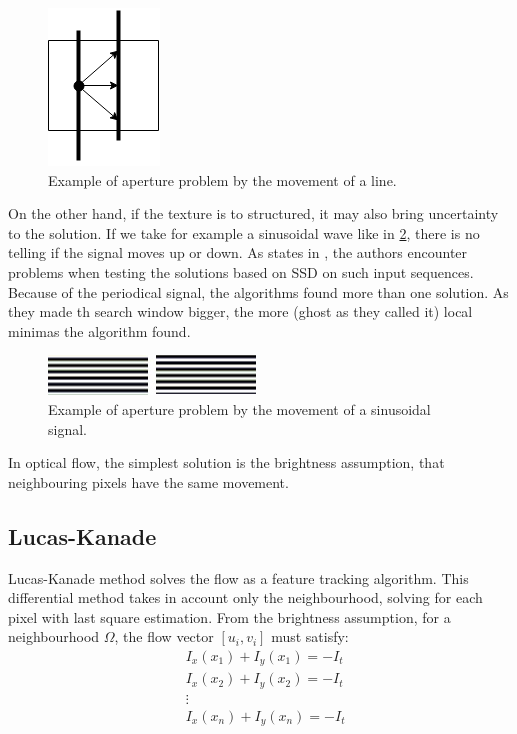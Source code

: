 \documentclass[12pt,a4paper,twoside]{report}
\begin{document}
\begin{figure}
	\label{apertureimg}
	\centering
	\includegraphics{img/Aperture}
	\caption{Example of aperture problem by the movement of a line.}
\end{figure}

On the other hand, if the texture is to structured, it may also bring uncertainty to the solution. If we take for example a sinusoidal wave like in \ref{apertureimgSin}, there is no telling if the signal moves up or down. As states in \cite{barron1994}, the authors encounter problems when testing the solutions based on SSD on such input sequences. Because of the periodical signal, the algorithms found more than one solution. As they made th search window bigger, the more (ghost as they called it) local minimas the algorithm found. 

\begin{figure}
	\label{apertureimgSin}
	\centering
	\includegraphics{img/sin}
	\caption{Example of aperture problem by the movement of a sinusoidal signal.}
\end{figure}


In optical flow, the simplest solution is the brightness assumption, that neighbouring pixels have the same movement.

\subsection{Lucas-Kanade}
Lucas-Kanade method solves the flow as a feature tracking algorithm. This differential method takes in account only the neighbourhood, solving for each pixel with last square estimation. From the brightness assumption, for a neighbourhood $\Omega$, the flow vector $[u_i,v_i]$ must satisfy: 
\begin{equation}
\begin{split}
	&I_x(x_1)+I_y(x_1) = - I_t	\\
	&I_x(x_2)+I_y(x_2) = - I_t \\
	&\vdots \\
	&I_x(x_n)+I_y(x_n) = - I_t 
	\end{split}
\end{equation} 
\end{document}
